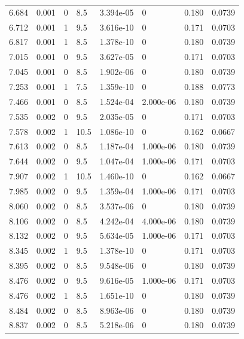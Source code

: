 \documentclass[preview]{standalone}
\begin{document}
{{{\begin{tabular}{L{1.2cm}C{1.2cm} C{0.3cm}C{0.5cm} C{1.4cm}C{1.4cm} C{1.4cm}C{1.4cm}}
  6.684  &  0.001  & 0     & 8.5 &  3.394e-05  & 0  & 0.180 &  0.0739   \\ 
  6.712  &  0.001  & 1     & 9.5 &  3.616e-10  & 0  & 0.171 &  0.0703   \\ 
  6.817  &  0.001  & 1     & 8.5 &  1.378e-10  & 0  & 0.180 &  0.0739   \\ 
  7.015  &  0.001  & 0     & 9.5 &  3.627e-05  & 0  & 0.171 &  0.0703   \\ 
  7.045  &  0.001  & 0     & 8.5 &  1.902e-06  & 0  & 0.180 &  0.0739   \\ 
  7.253  &  0.001  & 1     & 7.5 &  1.359e-10  & 0  & 0.188 &  0.0773   \\ 
  7.466  &  0.001  & 0     & 8.5 &  1.524e-04  & 2.000e-06  & 0.180 &  0.0739   \\ 
  7.535  &  0.002  & 0     & 9.5 &  2.035e-05  & 0  & 0.171 &  0.0703   \\ 
  7.578  &  0.002  & 1     & 10.5 &  1.086e-10  & 0  & 0.162 &  0.0667   \\ 
  7.613  &  0.002  & 0     & 8.5 &  1.187e-04  & 1.000e-06  & 0.180 &  0.0739   \\ 
  7.644  &  0.002  & 0     & 9.5 &  1.047e-04  & 1.000e-06  & 0.171 &  0.0703   \\ 
  7.907  &  0.002  & 1     & 10.5 &  1.460e-10  & 0  & 0.162 &  0.0667   \\ 
  7.985  &  0.002  & 0     & 9.5 &  1.359e-04  & 1.000e-06  & 0.171 &  0.0703   \\ 
  8.060  &  0.002  & 0     & 8.5 &  3.537e-06  & 0  & 0.180 &  0.0739   \\ 
  8.106  &  0.002  & 0     & 8.5 &  4.242e-04  & 4.000e-06  & 0.180 &  0.0739   \\ 
  8.132  &  0.002  & 0     & 9.5 &  5.634e-05  & 1.000e-06  & 0.171 &  0.0703   \\ 
  8.345  &  0.002  & 1     & 9.5 &  1.378e-10  & 0  & 0.171 &  0.0703   \\ 
  8.395  &  0.002  & 0     & 8.5 &  9.548e-06  & 0  & 0.180 &  0.0739   \\ 
  8.476  &  0.002  & 0     & 9.5 &  9.616e-05  & 1.000e-06  & 0.171 &  0.0703   \\ 
  8.476  &  0.002  & 1     & 8.5 &  1.651e-10  & 0  & 0.180 &  0.0739   \\ 
  8.484  &  0.002  & 0     & 8.5 &  8.963e-06  & 0  & 0.180 &  0.0739   \\ 
  8.837  &  0.002  & 0     & 8.5 &  5.218e-06  & 0  & 0.180 &  0.0739   \\ 

\end{tabular}}}}
\end{document}

